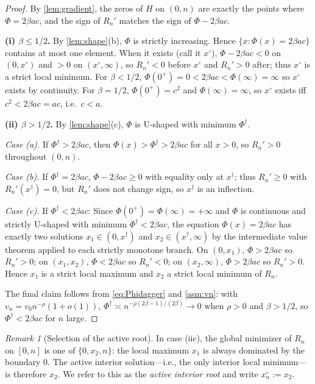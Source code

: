 \documentclass[11pt]{article}
\theoremstyle{plain}
\theoremstyle{definition}
\theoremstyle{remark}
\newtheorem{remark}[theorem]{Remark}
\begin{document}
\begin{proof}
By \cref{lem:gradient}, the zeros of $H$ on $(0,n)$ are exactly the points where $\Phi=2\beta ac$, and the sign of $R_n'$ matches the sign of $\Phi-2\beta ac$.

\textbf{(i) $\beta\le 1/2$.} By \cref{lem:shape}(b), $\Phi$ is strictly increasing. Hence $\{x:\Phi(x)=2\beta ac\}$ contains at most one element. When it exists (call it $x^\circ$), $\Phi-2\beta ac<0$ on $(0,x^\circ)$ and $>0$ on $(x^\circ,\infty)$, so $R_n'<0$ before $x^\circ$ and $R_n'>0$ after; thus $x^\circ$ is a strict local minimum. For $\beta<1/2$, $\Phi(0^+)=0<2\beta ac<\Phi(\infty)=\infty$ so $x^\circ$ exists by continuity. For $\beta=1/2$, $\Phi(0^+)=c^2$ and $\Phi(\infty)=\infty$, so $x^\circ$ exists iff $c^2<2\beta ac=ac$, i.e.\ $c<a$.

\textbf{(ii) $\beta>1/2$.} By \cref{lem:shape}(c), $\Phi$ is U-shaped with minimum $\Phi^\dagger$.

\emph{Case (a).} If $\Phi^\dagger>2\beta ac$, then $\Phi(x)>\Phi^\dagger>2\beta ac$ for all $x>0$, so $R_n'>0$ throughout $(0,n)$.

\emph{Case (b).} If $\Phi^\dagger=2\beta ac$, $\Phi-2\beta ac\ge0$ with equality only at $x^\dagger$; thus $R_n'\ge0$ with $R_n'(x^\dagger)=0$, but $R_n'$ does not change sign, so $x^\dagger$ is an inflection.

\emph{Case (c).} If $\Phi^\dagger<2\beta ac$: Since $\Phi(0^+)=\Phi(\infty)=+\infty$ and $\Phi$ is continuous and strictly U-shaped with minimum $\Phi^\dagger<2\beta ac$, the equation $\Phi(x)=2\beta ac$ has exactly two solutions $x_1\in(0,x^\dagger)$ and $x_2\in(x^\dagger,\infty)$ by the intermediate value theorem applied to each strictly monotone branch. On $(0,x_1)$, $\Phi>2\beta ac$ so $R_n'>0$; on $(x_1,x_2)$, $\Phi<2\beta ac$ so $R_n'<0$; on $(x_2,\infty)$, $\Phi>2\beta ac$ so $R_n'>0$. Hence $x_1$ is a strict local maximum and $x_2$ a strict local minimum of $R_n$.

The final claim follows from \cref{eq:Phidagger} and \cref{asm:vn}: with $v_n=v_0n^{-\rho}(1+o(1))$, $\Phi^\dagger\asymp n^{-\rho(2\beta-1)/(2\beta)}\to0$ when $\rho>0$ and $\beta>1/2$, so $\Phi^\dagger<2\beta ac$ for $n$ large.
\end{proof}

\begin{remark}[Selection of the active root]\label{rem:active-root}
In case (iic), the global minimizer of $R_n$ on $[0,n]$ is one of $\{0,x_2,n\}$: the local maximum $x_1$ is always dominated by the boundary $0$. The active interior solution---i.e., the only interior local minimum---is therefore $x_2$. We refer to this as the \emph{active interior root} and write $x_n^\circ:=x_2$.
\end{remark}
\end{document}
